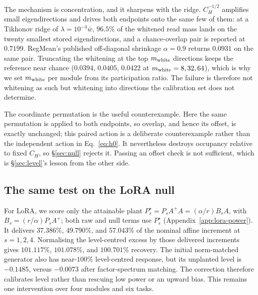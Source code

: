 The mechanism is concentration, and it sharpens with the ridge. $C_H^{-1/2}$ amplifies small
eigendirections and drives both endpoints onto the same few of them: at a Tikhonov ridge of
$\lambda=10^{-4}\bar w$, $96.5\%$ of the whitened read mass lands on the twenty smallest stored
eigendirections, and a chance-overlap pair is reported at $0.7199$. RegMean's published
off-diagonal shrinkage $\alpha=0.9$ returns $0.0931$ on the same pair. Truncating the whitening at
the top $m_{\rm white}$ directions keeps the reference near chance ($0.0394$, $0.0405$, $0.0422$ at
$m_{\rm white}=8,32,64$), which is why we set $m_{\rm white}$ per module from its participation
ratio. The failure is therefore not whitening as such but whitening into directions the
calibration set does not determine.

The coordinate permutation is the useful counterexample. Here the same permutation is applied to
both endpoints, so overlap, and hence its offset, is exactly unchanged; this paired action is a
deliberate counterexample rather than the independent action in Eq.~\ref{eq:h0}. It nevertheless
destroys occupancy relative to fixed $C_H$, so \S\ref{sec:null} rejects it. Passing an offset check
is not sufficient, which is \S\ref{sec:level}'s lesson from the other side.

\subsection{The same test on the LoRA null}
\label{sec:lora-power}

For LoRA, we score only the attainable plant
$P_s^\star=P_sA^+A=(\alpha/r)B_sA$, with $B_s=(r/\alpha)P_sA^+$; both raw and null terms use
$P_s^\star$ (Appendix~\ref{app:lora-power}). It delivers $37.386\%$, $49.790\%$, and $57.043\%$ of the nominal affine increment
at $s=1,2,4$. Normalising the level-centred excess by those delivered increments gives
$101.117\%$, $101.078\%$, and $100.701\%$ recovery. The initial norm-matched generator also has
near-$100\%$ level-centred response, but its unplanted level is $-0.1485$, versus $-0.0073$ after
factor-spectrum matching. The correction therefore calibrates level rather than rescuing low
power or an upward bias. This remains one intervention over four modules and six tasks.


